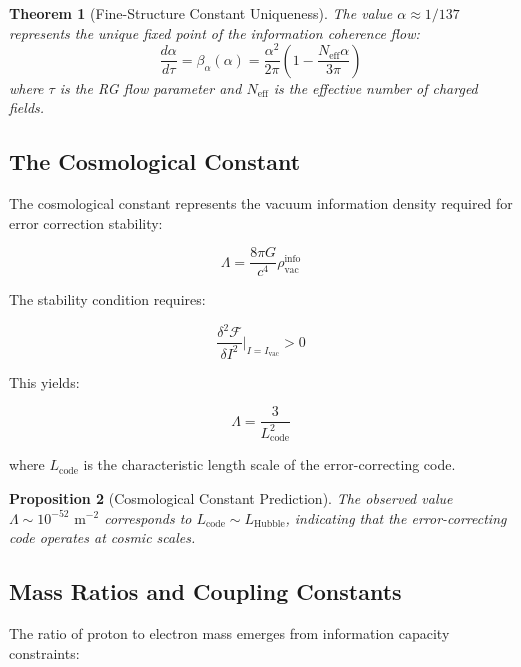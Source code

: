 \documentclass[12pt,a4paper]{article}
\newtheorem{theorem}{Theorem}[section]
\newtheorem{proposition}[theorem]{Proposition}
\begin{document}
\begin{theorem}[Fine-Structure Constant Uniqueness]
The value $\alpha \approx 1/137$ represents the unique fixed point of the information coherence flow:
\begin{equation}
\frac{d\alpha}{d\tau} = \beta_\alpha(\alpha) = \frac{\alpha^2}{2\pi}\left(1 - \frac{N_{\text{eff}}\alpha}{3\pi}\right)
\end{equation}
where $\tau$ is the RG flow parameter and $N_{\text{eff}}$ is the effective number of charged fields.
\end{theorem}

\subsection{The Cosmological Constant}

The cosmological constant represents the vacuum information density required for error correction stability:

\begin{equation}
\Lambda = \frac{8\pi G}{c^4} \rho_{\text{vac}}^{\text{info}}
\end{equation}

The stability condition requires:

\begin{equation}
\frac{\delta^2 \mathcal{F}}{\delta I^2}\bigg|_{I=I_{\text{vac}}} > 0
\end{equation}

This yields:

\begin{equation}
\Lambda = \frac{3}{L_{\text{code}}^2}
\end{equation}

where $L_{\text{code}}$ is the characteristic length scale of the error-correcting code.

\begin{proposition}[Cosmological Constant Prediction]
The observed value $\Lambda \sim 10^{-52} \text{ m}^{-2}$ corresponds to $L_{\text{code}} \sim L_{\text{Hubble}}$, indicating that the error-correcting code operates at cosmic scales.
\end{proposition}

\subsection{Mass Ratios and Coupling Constants}

The ratio of proton to electron mass emerges from information capacity constraints:
\end{document}
